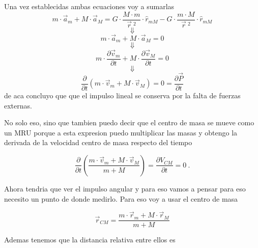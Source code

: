 \documentclass[../Main.tex]{subfiles}
\begin{document}
{    Una vez establecidas ambas ecuaciones voy a sumarlas
    \begin{equation*}
        m \cdot \vec{a}_m + M \cdot \vec{a}_M = G \cdot \frac{M \cdot m}{\vec{r} \ ^2} \cdot \hat{r}_{mM} - G \cdot \frac{m \cdot M}{\vec{r} \ ^2} \cdot \hat{r}_{mM}
    \end{equation*}
    \begin{equation*}
        \Downarrow
    \end{equation*}
    \begin{equation*}
        m \cdot \vec{a}_m + M \cdot \vec{a}_M = 0
    \end{equation*}
    \begin{equation*}
        \Downarrow
    \end{equation*}
    \begin{equation*}
        m \cdot \frac{\partial \vec{v}_m}{\partial t} + M \cdot \frac{\partial \vec{v}_M}{\partial t} = 0
    \end{equation*}
    \begin{equation*}
        \Downarrow
    \end{equation*}
    \begin{equation*}
        \frac{\partial }{\partial t} \left( m \cdot \vec{v}_m + M \cdot \vec{v}_M \right) = 0 = \frac{\partial \vec{P}}{\partial t}
    \end{equation*}
    de aca concluyo que que el impulso lineal se conserva por la falta de fuerzas
    externas.

    No solo eso, sino que tambien puedo decir que el centro de masa se mueve como
    un MRU porque a esta expresion puedo multiplicar las masas y obtengo la derivada
    de la velocidad centro de masa respecto del tiempo

}

\npage{
}
{

    \begin{equation*}
        \frac{\partial }{\partial t} \left( \frac{m \cdot \vec{v}_m + M \cdot \vec{v}_M}{m + M} \right) = \frac{\partial V_{CM}}{\partial t} = 0 \ .
    \end{equation*}

    Ahora tendria que ver el impulso angular y para eso vamos a pensar para eso
    necesito un punto de donde medirlo. Para eso voy a usar el centro de masa

    \begin{equation*}
        \vec{r}_{CM} = \frac{m \cdot \vec{r}_m + M \cdot \vec{r}_M}{m + M}
    \end{equation*}

    Ademas tenemos que la distancia relativa entre ellos es

}
\end{document}
